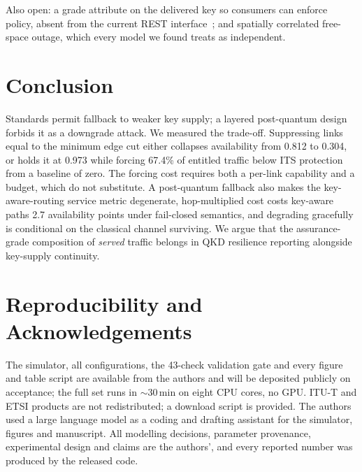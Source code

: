 \documentclass[conference]{IEEEtran}
\begin{document}
Also open: a grade attribute on the delivered key so consumers can enforce policy,
absent from the current REST interface~\cite{etsi014}; and spatially correlated
free-space outage, which every model we found treats as independent.

\section{Conclusion}
Standards permit fallback to weaker key supply; a layered post-quantum design
forbids it as a downgrade attack. We measured the trade-off. Suppressing links equal to the minimum edge
cut either collapses availability from 0.812 to 0.304, or holds it at 0.973 while
forcing 67.4\% of entitled traffic below ITS protection from a baseline of zero. The
forcing cost requires both a per-link capability and a budget, which do not
substitute. A post-quantum fallback also makes the key-aware-routing service metric
degenerate, hop-multiplied cost costs key-aware paths 2.7 availability points under
fail-closed semantics, and degrading gracefully is conditional on the classical
channel surviving.
We argue that the assurance-grade composition of \emph{served} traffic belongs in
QKD resilience reporting alongside key-supply continuity.

\section*{Reproducibility and Acknowledgements}
The simulator, all configurations, the 43-check validation gate and every figure and
table script are available from the authors and will be deposited publicly on
acceptance; the full set runs in $\sim$30\,min on eight CPU cores, no GPU. ITU-T and
ETSI products are not redistributed; a download script is provided. The authors used a
large language model as a coding and drafting assistant for the simulator, figures
and manuscript. All modelling decisions, parameter provenance, experimental design
and claims are the authors', and every reported number was produced by the released
code.
\end{document}
